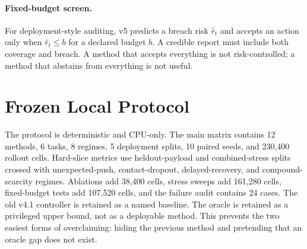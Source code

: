 \documentclass{article}
\begin{document}
\paragraph{Fixed-budget screen.} For deployment-style auditing, v5 predicts a breach risk $\hat r_t$ and accepts an action only when $\hat r_t \leq b$ for a declared budget $b$. A credible report must include both coverage and breach. A method that accepts everything is not risk-controlled; a method that abstains from everything is not useful.
\section{Frozen Local Protocol}
The protocol is deterministic and CPU-only. The main matrix contains 12 methods, 6 tasks, 8 regimes, 5 deployment splits, 10 paired seeds, and 230,400 rollout cells. Hard-slice metrics use heldout-payload and combined-stress splits crossed with unexpected-push, contact-dropout, delayed-recovery, and compound-scarcity regimes. Ablations add 38,400 cells, stress sweeps add 161,280 cells, fixed-budget tests add 107,520 cells, and the failure audit contains 24 cases.
The old v4.1 controller is retained as a named baseline. The oracle is retained as a privileged upper bound, not as a deployable method. This prevents the two easiest forms of overclaiming: hiding the previous method and pretending that an oracle gap does not exist.
\begin{table}[t]\centering\small\resizebox{\linewidth}{!}{}\caption{Frozen local gates. The external scope gate is separate and fails.}\label{tab:gates}\end{table}
\end{document}

